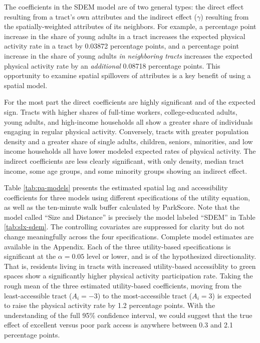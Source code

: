 \documentclass[Afour,sageh.bst]{sagej}
\begin{document}
The coefficients in the SDEM model are of two general types: the direct
effect resulting from a tract's own attributes and the indirect effect
(\(\gamma\)) resulting from the spatially-weighted attributes of its
neighbors. For example, a percentage point increase in the share of
young adults in a tract increases the expected physical activity rate in
a tract by 0.03872 percentage points, and a percentage point increase in
the share of young adults \emph{in neighboring tracts} increases the
expected physical activity rate by an \emph{additional} 0.08718
percentage points. This opportunity to examine spatial spillovers of
attributes is a key benefit of using a spatial model.

For the most part the direct coefficients are highly significant and of
the expected sign. Tracts with higher shares of full-time workers,
college-educated adults, young adults, and high-income households all
show a greater share of individuals engaging in regular physical
activity. Conversely, tracts with greater population density and a
greater share of single adults, children, seniors, minorities, and low
income households all have lower modeled expected rates of physical
activity. The indirect coefficients are less clearly significant, with
only density, median tract income, some age groups, and some minority
groups showing an indirect effect.

Table \ref{tab:pa-models} presents the estimated spatial lag and
accessibility coefficients for three models using different
specifications of the utility equation, as well as the ten-minute walk
buffer calculated by ParkScore. Note that the model called ``Size and
Distance'' is precisely the model labeled ``SDEM'' in Table
\ref{tab:slx-sdem}. The controlling covariates are suppressed for
clarity but do not change meaningfully across the four specifications.
Complete model estimates are available in the Appendix. Each of the
three utility-based specifications is significant at the
\(\alpha = 0.05\) level or lower, and is of the hypothesized
directionality. That is, residents living in tracts with increased
utility-based accessiblity to green spaces show a significantly higher
physical activity participation rate. Taking the rough mean of the three
estimated utility-based coefficients, moving from the least-accessible
tract (\(A_i = -3\)) to the most-accessible tract (\(A_i = 3\)) is
expected to raise the physical activity rate by 1.2 percentage points.
With the understanding of the full 95\% confidence interval, we could
suggest that the true effect of excellent versus poor park access is
anywhere between 0.3 and 2.1 percentage points.
\end{document}

